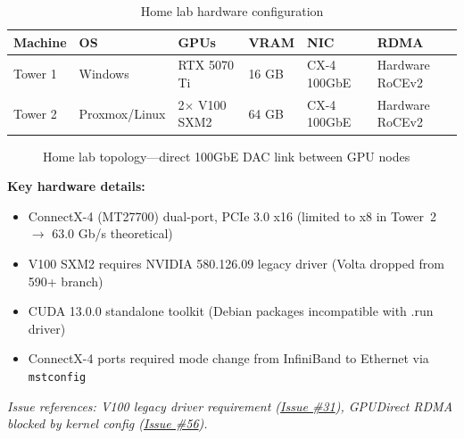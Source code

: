 \documentclass[10pt,letterpaper]{article}
\begin{document}
\begin{table}[H]
\centering
\small
\begin{tabular}{@{}llllll@{}}
\toprule
\textbf{Machine} & \textbf{OS} & \textbf{GPUs} & \textbf{VRAM} & \textbf{NIC} & \textbf{RDMA} \\
\midrule
Tower 1 & Windows & RTX 5070 Ti & 16 GB & CX-4 100GbE & Hardware RoCEv2 \\
Tower 2 & Proxmox/Linux & 2$\times$ V100 SXM2 & 64 GB & CX-4 100GbE & Hardware RoCEv2 \\
\bottomrule
\end{tabular}
\caption{Home lab hardware configuration}
\end{table}

\begin{figure}[H]
\centering
{}
\caption{Home lab topology---direct 100GbE DAC link between GPU nodes}
\end{figure}

\textbf{Key hardware details:}
\begin{itemize}[noitemsep]
    \item ConnectX-4 (MT27700) dual-port, PCIe 3.0 x16 (limited to x8 in Tower~2 $\rightarrow$ 63.0 Gb/s theoretical)
    \item V100 SXM2 requires NVIDIA 580.126.09 legacy driver (Volta dropped from 590+ branch)
    \item CUDA 13.0.0 standalone toolkit (Debian packages incompatible with .run driver)
    \item ConnectX-4 ports required mode change from InfiniBand to Ethernet via \texttt{mstconfig}
\end{itemize}

\textit{Issue references: V100 legacy driver requirement (\href{https://github.com/ndg8743/ScuffedRDMA/issues/31}{Issue \#31}), GPUDirect RDMA blocked by kernel config (\href{https://github.com/ndg8743/ScuffedRDMA/issues/56}{Issue \#56}).}
\end{document}
